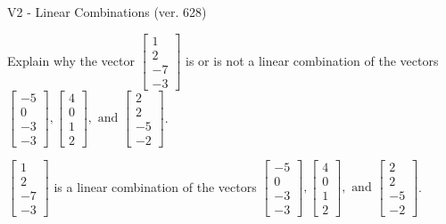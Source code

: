 \begin{exercise}
  \begin{exerciseTitle}V2 - Linear Combinations (ver. 628)\end{exerciseTitle}
  \begin{exerciseStatement}
    Explain why the vector \(\left[\begin{array}{c}
1 \\
2 \\
-7 \\
-3
\end{array}\right]\)  is or is not a linear 
	combination of the vectors \(\left[\begin{array}{c}
-5 \\
0 \\
-3 \\
-3
\end{array}\right] , \left[\begin{array}{c}
4 \\
0 \\
1 \\
2
\end{array}\right] , \text{ and } \left[\begin{array}{c}
2 \\
2 \\
-5 \\
-2
\end{array}\right]\).
	


  \end{exerciseStatement}
  \begin{exerciseAnswer}
   \(\left[\begin{array}{c}
1 \\
2 \\
-7 \\
-3
\end{array}\right]\) 
  	 is  
	a linear combination of the vectors \(\left[\begin{array}{c}
-5 \\
0 \\
-3 \\
-3
\end{array}\right] , \left[\begin{array}{c}
4 \\
0 \\
1 \\
2
\end{array}\right] , \text{ and } \left[\begin{array}{c}
2 \\
2 \\
-5 \\
-2
\end{array}\right]\).

	
  


  \end{exerciseAnswer}
\end{exercise}
